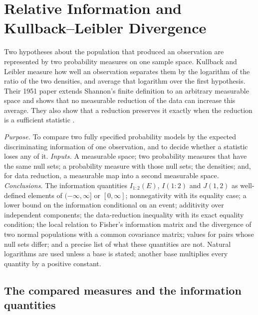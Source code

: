 \chapter{Relative Information and Kullback--Leibler Divergence}
\label{sec:p15-w02b-p15-045-relative-information}

Two hypotheses about the population that produced an observation are
represented by two probability measures on one sample space. Kullback
and Leibler measure how well an observation separates them by the
logarithm of the ratio of the two densities, and average that logarithm
over the first hypothesis. Their 1951 paper extends Shannon's finite
definition to an arbitrary measurable space and shows that no
measurable reduction of the data can increase this average. They also
show that a reduction preserves it exactly when the reduction is a
sufficient statistic \cite[p.~79]{KullbackLeibler1951Information}.

\emph{Purpose.} To compare two fully specified probability models by the
expected discriminating information of one observation, and to decide
whether a statistic loses any of it.
\emph{Inputs.} A measurable space; two probability measures that have the
same null sets; a probability measure with those null sets; the densities;
and, for data reduction, a measurable map into a second measurable space.
\emph{Conclusions.} The information quantities \(I_{1:2}(E)\), \(I(1:2)\)
and \(J(1,2)\) as well-defined elements of \((-\infty,\infty]\) or
\([0,\infty]\); nonnegativity with its equality case; a lower bound on
the information conditional on an event; additivity over independent
components; the data-reduction inequality with its exact equality
condition; the local relation to Fisher's information matrix and the
divergence of two normal populations with a common covariance matrix;
values for pairs whose null sets differ; and a precise list of what these
quantities are not.
Natural logarithms are used unless a base is stated; another base
multiplies every quantity by a positive constant.

\section{The compared measures and the information quantities}
\label{sec:p15-w02b-p15-045-setting}

